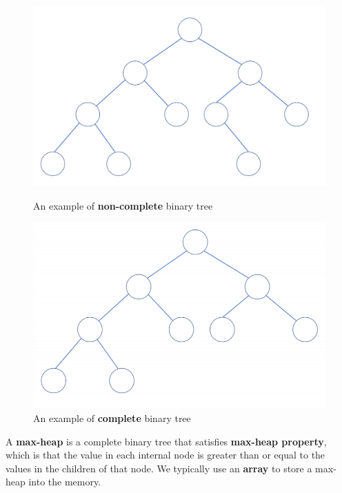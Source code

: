 \documentclass{article}
\begin{document}
\begin{figure}
\begin{center}  \includegraphics[scale=0.5]{image004.png}\end{center}
  \caption{An example of \textbf{non-complete} binary tree}
  \begin{center}\includegraphics[scale=0.75]{image005.png}\end{center}
  \caption{An example of \textbf{complete} binary tree}
 \end{figure}
\begin{center}
\end{center}
A \textbf{max-heap} is a complete binary tree that satisfies \textbf{max-heap property}, which is that the value in each internal node is greater than or equal to the values in the children of that node.
We typically use an \textbf{array} to store a max-heap into the memory.
\end{document}
